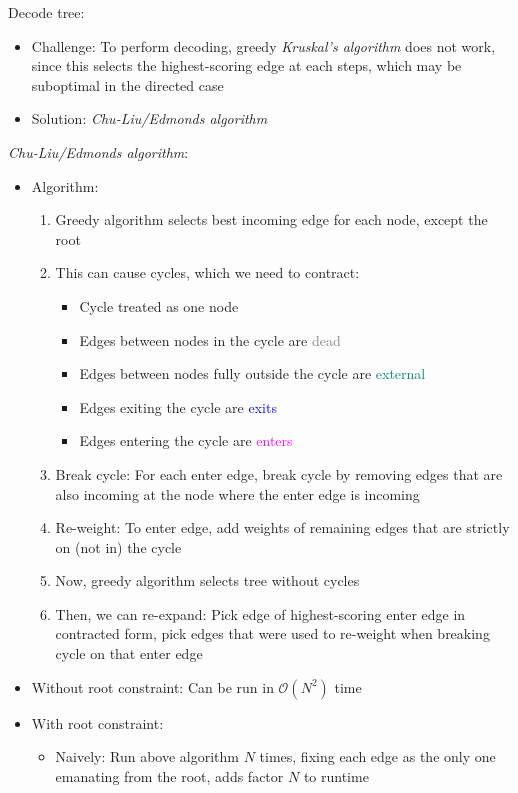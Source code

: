 Decode tree:
\begin{itemize}
    \item Challenge: To perform decoding, greedy \emph{Kruskal's algorithm} does not work, since this selects the highest-scoring edge at each steps, which may be suboptimal in the directed case
    \item Solution: \emph{Chu-Liu/Edmonds algorithm}
\end{itemize}

\emph{Chu-Liu/Edmonds algorithm}:
\begin{itemize}
    \item Algorithm:
    \begin{enumerate}
        \item Greedy algorithm selects best incoming edge for each node, except the root
        \item This can cause cycles, which we need to contract:
        \begin{itemize}
            \item Cycle treated as one node
            \item Edges between nodes in the cycle are \textcolor{gray}{dead}
            \item Edges between nodes fully outside the cycle are \textcolor{teal}{external}
            \item Edges exiting the cycle are \textcolor{blue}{exits}
            \item Edges entering the cycle are \textcolor{magenta}{enters}
        \end{itemize}
        \item Break cycle: For each enter edge, break cycle by removing edges that are also incoming at the node where the enter edge is incoming
        \item Re-weight: To enter edge, add weights of remaining edges that are strictly on (not in) the cycle
        \item Now, greedy algorithm selects tree without cycles
        \item Then, we can re-expand: Pick edge of highest-scoring enter edge in contracted form, pick edges that were used to re-weight when breaking cycle on that enter edge
    \end{enumerate}
    \item Without root constraint: Can be run in $\mathcal{O}(N^2)$ time
    \item With root constraint:
    \begin{itemize}
        \item Naively: Run above algorithm $N$ times, fixing each edge as the only one emanating from the root, adds factor $N$ to runtime

\end{itemize}
\end{itemize}
